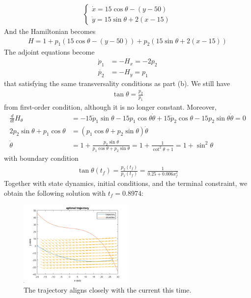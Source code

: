 \documentclass[12pt]{article}
\begin{document}
\begin{problem}[4]
\begin{enumerate}[label=(\alph*)]
\begin{align*}
	\begin{cases}
		\dot{x} = 15 \cos \theta -(y-50)\\
		\dot{y} = 15 \sin \theta + 2(x-15)
	\end{cases}
\end{align*}
And the Hamiltonian becomes
\begin{align*}
	H = 1+ p_1 (15 \cos \theta - (y-50)) + p_2(15 \sin \theta + 2(x-15))
\end{align*}
The adjoint equations become
\begin{align*}
	\dot{p}_1 &= -H_x = -2p_2 \\
	\dot{p_2} &= -H_y = p_1
\end{align*}
that satisfying the same transversality conditions as part (b). We still have
\begin{align*}
	\tan \theta = \frac{p_2}{ p_1}
\end{align*}
from first-order condition, although it is no longer constant. Moreover,
\begin{align*}
	\frac{d}{dt} H_{ \theta} &= -15 \dot{p}_1 \sin \theta - 15 p_1 \cos \theta \dot{\theta} + 15 \dot{p}_2 \cos \theta -15 p_2 \sin \theta \dot{\theta} =0\\
	2p_2 \sin \theta + p_1 \cos \theta &= (p_1 \cos \theta + p_2 \sin \theta) \dot{\theta}\\
	\dot{\theta} &=1+ \frac{p_2 \sin \theta}{ p_1 \cos \theta + p_2 \sin \theta } = 1+ \frac{1}{\cot^2\theta+1} = 1+ \sin^2\theta
\end{align*}
with boundary condition
 \begin{align*}
	\tan \theta(t_f) = \frac{p_2(t_f)}{p_1(t_f) } =\frac{1}{0.25+0.006x_f^2}
\end{align*}
Together with state dynamics, initial conditions, and the terminal constraint, we obtain the following solution with $ t_f = 0.8974$:
~\begin{figure}[H]
	\centering
	\includegraphics[width=0.5\textwidth]{./figures/5.4c.1.png}
	\caption{The trajectory aligns closely with the current this time.}

\end{figure}
\end{enumerate}
\end{problem}
\end{document}
